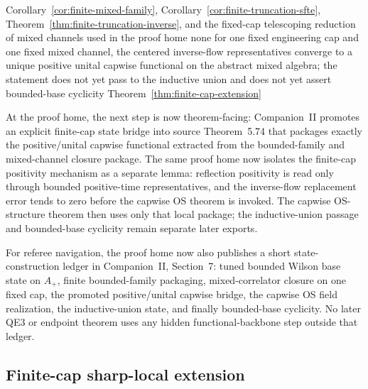 \dependencyledger
  {Corollary~\ref{cor:finite-mixed-family}, Corollary~\ref{cor:finite-truncation-sfte}, Theorem~\ref{thm:finite-truncation-inverse}, and the fixed-cap telescoping reduction of mixed channels used in the proof home}
  {none}
  {for one fixed engineering cap and one fixed mixed channel, the centered inverse-flow representatives converge to a unique positive unital capwise functional on the abstract mixed algebra; the statement does not yet pass to the inductive union and does not yet assert bounded-base cyclicity}
  {Theorem~\ref{thm:finite-cap-extension}}

At the proof home, the next step is now theorem-facing: Companion~II promotes an explicit finite-cap state bridge into source Theorem~5.74 that packages exactly the positive/unital capwise functional extracted from the bounded-family and mixed-channel closure package. The same proof home now isolates the finite-cap positivity mechanism as a separate lemma: reflection positivity is read only through bounded positive-time representatives, and the inverse-flow replacement error tends to zero before the capwise OS theorem is invoked. The capwise OS-structure theorem then uses only that local package; the inductive-union passage and bounded-base cyclicity remain separate later exports.

For referee navigation, the proof home now also publishes a short state-construction ledger in Companion~II, Section~7: tuned bounded Wilson base state on $A_+$, finite bounded-family packaging, mixed-correlator closure on one fixed cap, the promoted positive/unital capwise bridge, the capwise OS field realization, the inductive-union state, and finally bounded-base cyclicity. No later QE3 or endpoint theorem uses any hidden functional-backbone step outside that ledger.

\subsection{Finite-cap sharp-local extension}


